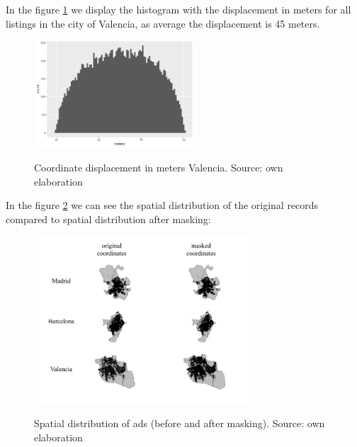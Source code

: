 \documentclass[times,final]{elsarticle}
\begin{document}
In the figure \ref{fig:coordinates-displacement} we display the histogram with the displacement in meters for all listings in the city of Valencia, as average the displacement is 45 meters.

\begin{figure}
  \caption{Coordinate displacement in meters Valencia. Source: own elaboration}
  \centering
  \includegraphics[width=6cm, height=4cm]{figures/coordinates/coordinates-valencia}
  \label{fig:coordinates-displacement}
\end{figure}


In the figure \ref{fig:points-pre-post-all} we can see the spatial distribution of the original records compared to spatial distribution after masking:

\begin{figure}[h]
  \caption{Spatial distribution of ads (before and after masking). Source: own elaboration}
  \centering
  \includegraphics[width=8cm]{figures/points-pre-post-all}
  \label{fig:points-pre-post-all}
\end{figure}







%
\end{document}
